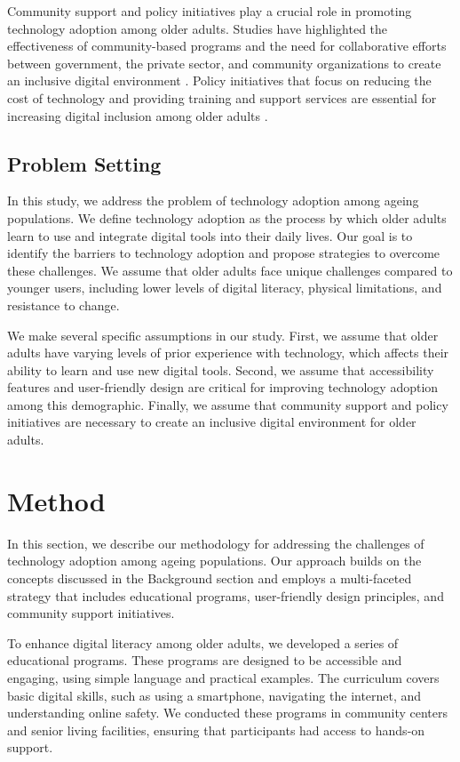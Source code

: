 \documentclass{article} %
\begin{document}
Community support and policy initiatives play a crucial role in promoting technology adoption among older adults. Studies have highlighted the effectiveness of community-based programs and the need for collaborative efforts between government, the private sector, and community organizations to create an inclusive digital environment \citep{west2023agent}. Policy initiatives that focus on reducing the cost of technology and providing training and support services are essential for increasing digital inclusion among older adults \citep{zhou2023peer}.

\subsection{Problem Setting}
\label{sec:problem_setting}

In this study, we address the problem of technology adoption among ageing populations. We define technology adoption as the process by which older adults learn to use and integrate digital tools into their daily lives. Our goal is to identify the barriers to technology adoption and propose strategies to overcome these challenges. We assume that older adults face unique challenges compared to younger users, including lower levels of digital literacy, physical limitations, and resistance to change.

We make several specific assumptions in our study. First, we assume that older adults have varying levels of prior experience with technology, which affects their ability to learn and use new digital tools. Second, we assume that accessibility features and user-friendly design are critical for improving technology adoption among this demographic. Finally, we assume that community support and policy initiatives are necessary to create an inclusive digital environment for older adults.

\section{Method}
\label{sec:method}

In this section, we describe our methodology for addressing the challenges of technology adoption among ageing populations. Our approach builds on the concepts discussed in the Background section and employs a multi-faceted strategy that includes educational programs, user-friendly design principles, and community support initiatives.

To enhance digital literacy among older adults, we developed a series of educational programs. These programs are designed to be accessible and engaging, using simple language and practical examples. The curriculum covers basic digital skills, such as using a smartphone, navigating the internet, and understanding online safety. We conducted these programs in community centers and senior living facilities, ensuring that participants had access to hands-on support.
\end{document}
